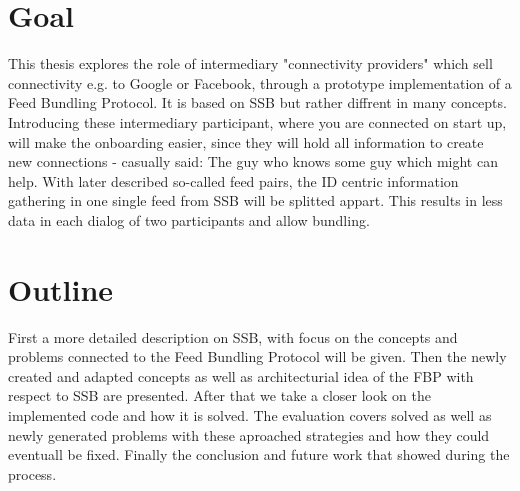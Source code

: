 \section{Goal}
This thesis explores the role of intermediary "connectivity providers" which sell connectivity e.g. to Google or Facebook, through a prototype implementation of a Feed Bundling Protocol. It is based on SSB but rather diffrent in many concepts. Introducing these intermediary participant, where you are connected on start up, will make the onboarding easier, since they will hold all information to create new connections - casually said: The guy who knows some guy which might can help. With later described so-called feed pairs, the ID centric information gathering in one single feed from SSB will be splitted appart. This results in less data in each dialog of two participants and allow bundling.


\section{Outline}

First a more detailed description on SSB, with focus on the concepts and problems connected to the Feed Bundling Protocol will be given. Then the newly created and adapted concepts as well as architecturial idea of the FBP with respect to SSB are presented. After that we take a closer look on the implemented code and how it is solved. The evaluation covers solved as well as newly generated problems with these aproached strategies and how they could eventuall be fixed. Finally the conclusion and future work that showed during the process.


